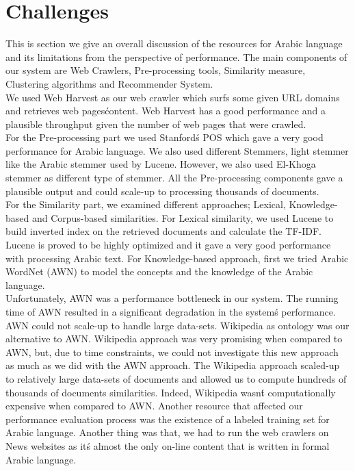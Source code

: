 \section{Challenges}\label{sec:challenges}
This is section we give an overall discussion of the resources for Arabic language and its limitations from the perspective of performance. The main components of our system are Web Crawlers, Pre-processing tools, Similarity measure, Clustering algorithms and Recommender System. \\
We used Web Harvest as our web crawler which surfs some given URL domains and retrieves web pages\' content. Web Harvest has a good performance and a plausible throughput given the number of web pages that were crawled. \\For the Pre-processing part we used Stanford\'s POS which gave a very good performance for Arabic language. We also used different Stemmers, light stemmer like the Arabic stemmer used by Lucene. However, we also used El-Khoga stemmer as different type of stemmer. All the Pre-processing components gave a plausible output and could scale-up to processing thousands of documents.\\ 
For the Similarity part, we examined different approaches; Lexical, Knowledge-based and Corpus-based similarities. For Lexical similarity, we used Lucene to build inverted index on the retrieved documents and calculate the TF-IDF. \\
Lucene is proved to be highly optimized and it gave a very good performance with processing Arabic text. For Knowledge-based approach, first we tried Arabic WordNet (AWN) to model the concepts and the knowledge of the Arabic language. \\
Unfortunately, AWN was a performance bottleneck in our system. The running time of AWN resulted in a significant degradation in the system\'s performance. AWN could not scale-up to handle large data-sets. Wikipedia as ontology was our alternative to AWN. Wikipedia approach was very promising when compared to AWN, but, due to time constraints, we could not investigate this new approach as much as we did with the AWN approach. The Wikipedia approach scaled-up to relatively large data-sets of documents and allowed us to compute hundreds of thousands of documents similarities. Indeed, Wikipedia wasn\'t computationally expensive when compared to AWN. 
Another resource that affected our performance evaluation process was the existence of a labeled training set for Arabic language. Another thing was that, we had to run the web crawlers on News websites as it\'s almost the only on-line content that is written in formal Arabic language. \\

